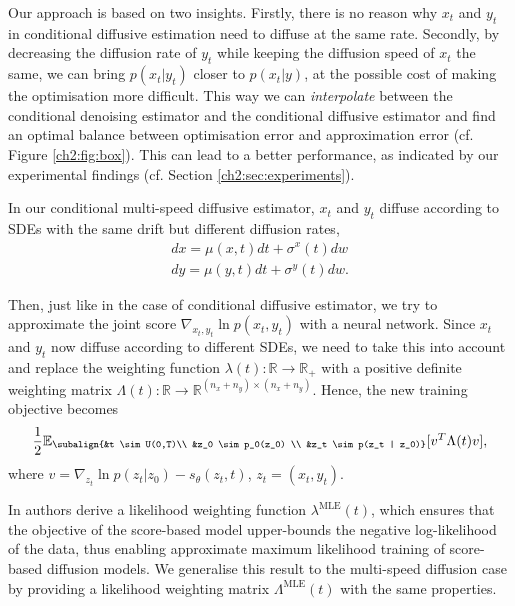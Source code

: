 Our approach is based on two insights. Firstly, there is no reason why $x_t$ and $y_t$ in conditional diffusive estimation need to diffuse at the same rate. Secondly, by decreasing the diffusion rate of $y_t$ while keeping the diffusion speed of $x_t$ the same, we can bring $p(x_t |y_t)$ closer to $p(x_t |y)$, at the possible cost of making the optimisation more difficult. This way we can \emph{interpolate} between the conditional denoising estimator and the conditional diffusive estimator and find an optimal balance between optimisation error and approximation error (cf. Figure \ref{ch2:fig:box}). This can lead to a better performance, as indicated by our experimental findings (cf. Section \ref{ch2:sec:experiments}).

In our conditional multi-speed diffusive estimator, $x_t$ and $y_t$ diffuse according to SDEs with the same drift but different diffusion rates,
\begin{gather*}
    dx = \mu(x,t)dt+\sigma^x(t)dw  \\
    dy = \mu(y,t)dt+\sigma^y(t)dw.
\end{gather*}


Then, just like in the case of conditional diffusive estimator, we try to approximate the joint score $\nabla_{x_t, y_t} \ln p(x_t, y_t)$ with a neural network. Since $x_t$ and $y_t$ now diffuse according to different SDEs, we need to take this into account and replace the weighting function $\lambda(t):\mathbb{R} \xrightarrow{} \mathbb{R}_+ $ with a positive definite weighting matrix $\Lambda(t): \mathbb{R} \xrightarrow{} \mathbb{R}^{(n_x + n_y) \times (n_x + n_y)}$. Hence, the new training objective becomes
\begin{gather}
    \label{ch2:eq:CMDE}
    \begin{aligned}
        \frac{1}{2} \mathbb{E}_{\subalign{&t \sim U(0,T)\\ &z_0 \sim p_0(z_0) \\ &z_t \sim p(z_t | z_0)}} 
        [
            v^T \Lambda(t) v
        ],
    \end{aligned}
\end{gather}
where $v=\nabla_{z_t} \ln{p(z_t |z_0)} - s_\theta(z_t,t)$, $z_t=(x_t,y_t)$.

In \cite{song2021maximum} authors derive a likelihood weighting function $\lambda^{\text{MLE}}(t)$, which ensures that the objective of the score-based model upper-bounds the negative log-likelihood of the data, thus enabling approximate maximum likelihood training of score-based diffusion models. We generalise this result to the multi-speed diffusion case by providing a likelihood weighting matrix $\Lambda^{\text{MLE}}(t)$ with the same properties.

